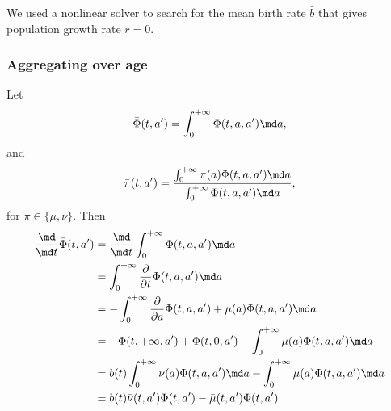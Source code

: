 \documentclass{jpmarticle}
\begin{document}
We used a nonlinear solver to search for the mean birth rate $\bar{b}$
that gives population growth rate $r = 0$.


\subsubsection{Aggregating over age}

Let
\begin{equation}
  \bar{\Phi}(t, a')
  = \int_0^{+\infty} \Phi(t, a, a') \md a,
\end{equation}
and
\begin{equation}
  \bar{\pi}(t, a')
  = \frac{\int_0^{+\infty} \pi(a) \Phi(t, a, a') \md a}
  {\int_0^{+\infty} \Phi(t, a, a') \md a},
\end{equation}
for $\pi \in \{\mu, \nu\}$. Then
\begin{equation}
  \begin{split}
    \frac{\md}{\md t} \bar{\Phi}(t, a')
    &= \frac{\md}{\md t} \int_0^{+\infty} \Phi(t, a, a') \md a
    \\
    &= \int_0^{+\infty} \frac{\partial}{\partial t} \Phi(t, a, a') \md a
    \\
    &= - \int_0^{+\infty} \frac{\partial}{\partial a} \Phi(t, a, a')
    + \mu(a) \Phi(t, a, a') \md a
    \\
    &= - \Phi(t, +\infty, a')
    + \Phi(t, 0, a')
    - \int_0^{+\infty} \mu(a) \Phi(t, a, a') \md a
    \\
    &= b(t) \int_0^{+\infty} \nu(a) \Phi(t, a, a') \md a
    - \int_0^{+\infty} \mu(a) \Phi(t, a, a') \md a
    \\
    &= b(t) \bar{\nu}(t, a') \bar{\Phi}(t, a')
    - \bar{\mu}(t, a') \bar{\Phi}(t, a').
  \end{split}
\end{equation}
\end{document}
